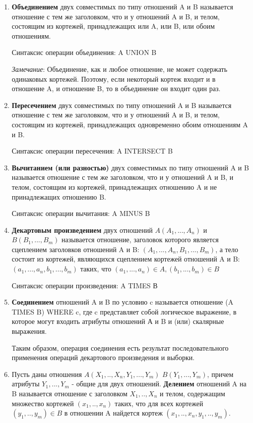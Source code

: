 \begin{enumerate}
    \item   \textbf{Объединением} двух совместимых по типу отношений A и B называется отношение с тем же заголовком, что и у отношений A и B, и телом, состоящим из кортежей, принадлежащих или A, или B, или обоим отношениям.

Синтаксис операции объединения: A UNION B


\textit{Замечание}: Объединение, как и любое отношение, не может содержать одинаковых кортежей. Поэтому, если некоторый кортеж входит и в отношение A, и отношение B, то в объединение он входит один раз.


\item 
\textbf{Пересечением} двух совместимых по типу отношений A и B называется отношение с тем же заголовком, что и у отношений A и B, и телом, состоящим из кортежей, принадлежащих одновременно обоим отношениям A и B.

Синтаксис операции пересечения: A INTERSECT B

\item  \textbf{Вычитанием (или разностью)} двух совместимых по типу отношений A и B называется отношение с тем же заголовком, что и у отношений A и B, и телом, состоящим из кортежей, принадлежащих отношению A и не принадлежащих отношению B. 

Синтаксис операции вычитания: A MINUS B

\item \textbf{Декартовым произведением} двух отношений $A(A_1, ..., A_n)$ и $B(B_1,..., B_m)$ называется отношение, заголовок которого является сцеплением заголовков отношений A и B: $(A_1, ..., A_n, B_1,..., B_m)$,
а тело состоит из кортежей, являющихся сцеплением кортежей отношений A и B: $(a_1, ..., a_n, b_1,..., b_m)$ таких, что $(a_1, ..., a_n) \in A, (b_1,..., b_m) \in B$

Синтаксис операции произведения: A TIMES В

\item    \textbf{Соединением} отношений A и B по условию c называется отношение (A TIMES B) WHERE c, где c представляет собой логическое выражение, в которое могут входить атрибуты отношений А и B и (или) скалярные выражения.

Таким образом, операция соединения есть результат последовательного применения операций декартового произведения и выборки. 


\item Пусть даны отношения $A(X_1, .., X_n, Y_1, ..., Y_m)$  $B(Y_1, ..., Y_m)$, причем атрибуты $Y_1, ..., Y_m$ - общие для двух отношений. \textbf{Делением} отношений A на B называется отношение с заголовком  $X_1, .., X_n$ и телом, содержащим множество кортежей $(x_1, .., x_n)$ таких, что для всех кортежей $(y_1, .., y_m) \in B$ в отношении A найдется кортеж $(x_1, .., x_n, y_1, .., y_m)$.


\end{enumerate}
